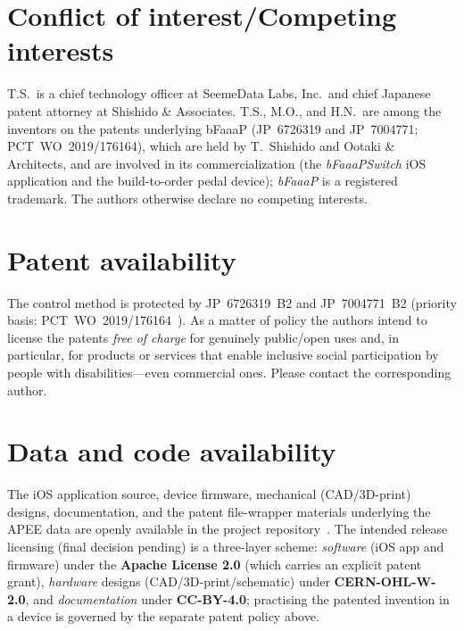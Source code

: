 \documentclass[11pt]{article}
\begin{document}
\section*{Conflict of interest/Competing interests}
T.S.\ is a chief technology officer at SeemeData Labs, Inc.\ and chief Japanese
patent attorney at Shishido \& Associates. T.S., M.O., and H.N.\ are among the
inventors on the patents underlying bFaaaP (JP~6726319 and JP~7004771;
PCT~WO~2019/176164), which are held by T.~Shishido and Ootaki \& Architects, and
are involved in its commercialization (the \emph{bFaaaPSwitch} iOS application and
the build-to-order pedal device); \emph{bFaaaP} is a registered trademark. The
authors otherwise declare no competing interests.

\section*{Patent availability}
The control method is protected by JP~6726319~B2 and JP~7004771~B2 (priority basis:
PCT~WO~2019/176164~\cite{pct2019}). As a matter of policy the authors intend to license the
patents \emph{free of charge} for genuinely public/open uses and, in particular,
for products or services that enable inclusive social participation by people with
disabilities---even commercial ones. Please contact the corresponding author.

\section*{Data and code availability}
The iOS application source, device firmware, mechanical (CAD/3D-print) designs,
documentation, and the patent file-wrapper materials underlying the APEE data are
openly available in the project repository~\cite{repo}. The intended release
licensing (final decision pending) is a three-layer scheme: \emph{software}
(iOS app and firmware) under the \textbf{Apache License 2.0} (which carries an
explicit patent grant), \emph{hardware} designs (CAD/3D-print/schematic) under
\textbf{CERN-OHL-W-2.0}, and \emph{documentation} under \textbf{CC-BY-4.0};
practising the patented invention in a device is governed by the separate patent
policy above.





\end{document}
